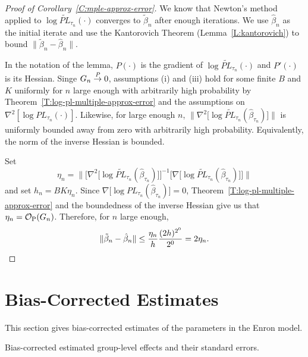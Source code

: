 \documentclass[aoas,preprint]{imsart}
\begin{document}
\begin{proof}[Proof of Corollary~\ref{C:mple-approx-error}]

We know that Newton's method applied to
$\log \widetilde{\mathit{PL}}_{\tau_n}(\cdot)$ converges to $\tilde \beta_n$
after enough iterations.  We use $\hat \beta_n$ as the initial iterate
and use the Kantorovich Theorem (Lemma~\ref{L:kantorovich}) to bound
$\|\tilde \beta_n - \hat \beta_n\|$.  

In the notation of the lemma, $P(\cdot)$ is the gradient of
$\log \widetilde{\mathit{PL}}_{\tau_n}(\cdot)$ and $P'(\cdot)$ is its Hessian.
Singe $G_n \overset{\mathit{P}}{\to} 0$, assumptions (i) and (iii) hold for
some finite $B$ and $K$ uniformly for $n$ large enough with arbitrarily
high probability by
Theorem~\ref{T:log-pl-multiple-approx-error}
and the assumptions on $\nabla^2 [\log {\mathit{PL}}_{\tau_n}(\cdot)]$.
Likewise, for large enough $n$,
\(
    \Big\|
        \nabla^2\big[
            \log \widetilde{\mathit{PL}}_{\tau_n}(\hat \beta_{\tau_n})
        \big]
    \Big\|
\)
is uniformly bounded away from zero with arbitrarily high probability.
Equivalently, the norm of the inverse Hessian is bounded.

Set
\[
    \eta_n =
    \Big\|
        \Big[
            \nabla^2\big[
                \log \widetilde{\mathit{PL}}_{\tau_n}(\hat \beta_{\tau_n})
            \big]
        \Big]^{-1}
        \Big[
            \nabla\big[
                \log \widetilde{\mathit{PL}}_{\tau_n}(\hat \beta_{\tau_n})
            \big]
        \Big]
    \Big\|
\]
and set $h_n = B K \eta_n$.
Since $\nabla\big[\log {\mathit{PL}}_{\tau_n}(\hat \beta_{\tau_n})\big] = 0$,
Theorem~\ref{T:log-pl-multiple-approx-error} and the boundedness of the
inverse Hessian give us that $\eta_n = \mathcal{O}_\text{P}(G_n)$.  Therefore, for $n$
large enough,
\[
    \| \tilde \beta_n - \hat \beta_n \|
        \leq \frac{\eta_n}{h}\frac{(2h)^{2^0}}{2^0} = 2 \eta_n.
    \qedhere
\]
\end{proof}


\section{Bias-Corrected Estimates}

This section gives bias-corrected estimates of the parameters in
the Enron model.

\begin{table}[h]
    \tiny
    
    \caption{
        Bias-corrected estimated group-level effects and their
        standard errors.
    }
    \label{T:group-effects-bc}
\end{table}
\end{document}
